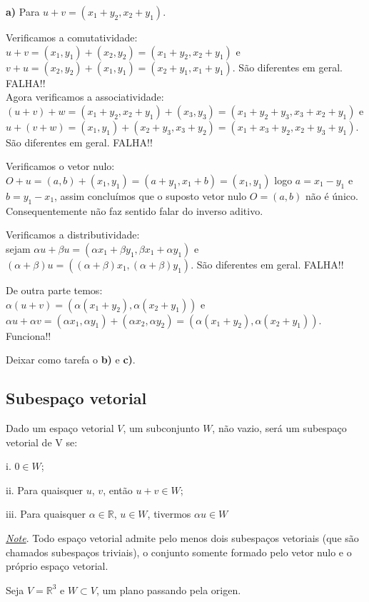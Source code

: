 \textbf{a)} Para $u+v=(x_{1}+y_{2},x_{2}+y_{1})$. 

Verificamos a comutatividade:\\
$u+v=(x_{1},y_{1})+(x_{2},y_{2})=(x_{1}+y_{2},x_{2}+y_{1})$ e $v+u=(x_{2},y_{2})+(x_{1},y_{1})=(x_{2}+y_{1},x_{1}+y_{1})$. São diferentes em geral. FALHA!!\\

Agora verificamos a associatividade:\\
$(u+v)+w=(x_{1}+y_{2},x_{2}+y_{1})+(x_{3},y_{3})=(x_{1}+y_{2}+y_{3},x_{3}+x_{2}+y_{1})$ e\\ $u+(v+w)=(x_{1},y_{1})+(x_{2}+y_{3},x_{3}+y_{2})=(x_{1}+x_{3}+y_{2},x_{2}+y_{3}+y_{1})$. São diferentes em geral. FALHA!!

Verificamos o vetor nulo:\\
$O+u=(a,b)+(x_{1},y_{1})=(a+y_{1},x_{1}+b)=(x_{1},y_{1})$ logo $a=x_{1}-y_{1}$ e $b=y_{1}-x_{1}$, assim concluímos que o suposto vetor nulo $O=(a,b)$ não é único. Consequentemente não faz sentido falar do inverso aditivo.

Verificamos a distributividade:\\
sejam $\alpha u +\beta u=(\alpha x_{1}+\beta y_{1},\beta x_{1}+\alpha y_{1})$ e $(\alpha+\beta)u=((\alpha+\beta)x_{1},(\alpha+\beta)y_{1})$. São diferentes em geral. FALHA!!

De outra parte temos:\\
$\alpha(u+v)=(\alpha(x_{1}+y_{2}),\alpha(x_{2}+y_{1}))$ e $\alpha u+\alpha v=(\alpha x_{1},\alpha y_{1})+(\alpha x_{2},\alpha y_{2})=(\alpha(x_{1}+y_{2}),\alpha(x_{2}+y_{1}))$. Funciona!!

Deixar como tarefa o \textbf{b)} e \textbf{c)}.

\subsection{Subespaço vetorial}
\begin{df}	
Dado um espaço vetorial $V$, um subconjunto $W$, não vazio, será um subespaço vetorial de V se:
\item[i.] $0\in W$;
\item[ii.] Para quaisquer $u$, $v$, então $u+v\in W$;
\item[iii.] Para quaisquer $\alpha\in \mathbb{R}$, $u\in W$, tivermos $\alpha u\in W$
\end{df}
\underline{\textit{Note}}. Todo espaço vetorial admite pelo menos dois subespaços vetoriais (que são chamados subespaços triviais), o conjunto somente formado pelo vetor nulo e o próprio espaço vetorial.
\begin{ex}
	Seja $V= \mathbb{R}^{3}$ e $W\subset V$, um plano passando pela origen.
\end{ex}

